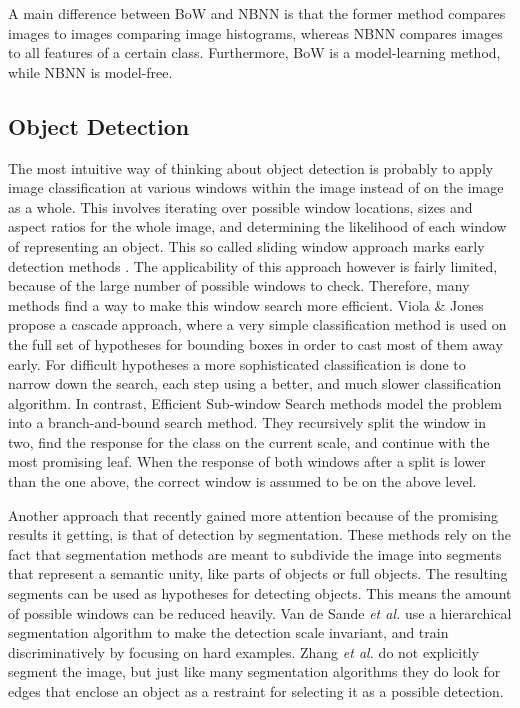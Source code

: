 A main difference between BoW and NBNN is that the former method compares images to images comparing image histograms, whereas NBNN compares images to all features of a certain class. Furthermore, BoW is a model-learning method, while NBNN is model-free.


\subsection{Object Detection} %
\label{sec:object_detection}

The most intuitive way of thinking about object detection is probably to apply image classification at various windows within the image instead of on the image as a whole. This involves iterating over possible window locations, sizes and aspect ratios for the whole image, and determining the likelihood of each window of representing an object. This so called sliding window approach marks early detection methods \cite{viola2004robust}. The applicability of this approach however is fairly limited, because of the large number of possible windows to check. Therefore, many methods find a way to make this window search more efficient. Viola \& Jones \cite{viola2004robust} propose a cascade approach, where a very simple classification method is used on the full set of hypotheses for bounding boxes in order to cast most of them away early. For difficult hypotheses a more sophisticated classification is done to narrow down the search, each step using a better, and much slower classification algorithm. In contrast, Efficient Sub-window Search methods \cite{behmo2010towards, lampert2008beyond, pedersoli2011coarse, yeh2009fast} model the problem into a branch-and-bound search method. They recursively split the window in two, find the response for the class on the current scale, and continue with the most promising leaf. When the response of both windows after a split is lower than the one above, the correct window is assumed to be on the above level.

Another approach that recently gained more attention because of the promising results it getting, is that of detection by segmentation. \cite{van2011segmentation,zhang2010free} These methods rely on the fact that segmentation methods are meant to subdivide the image into segments that represent a semantic unity, like parts of objects or full objects. The resulting segments can be used as hypotheses for detecting objects. This means the amount of possible windows can be reduced heavily. Van de Sande \emph{et al.} \cite{van2011segmentation} use a hierarchical segmentation algorithm to make the detection scale invariant, and train discriminatively by focusing on hard examples. Zhang \emph{et al.} \cite{zhang2010free} do not explicitly segment the image, but just like many segmentation algorithms they do look for edges that enclose an object as a restraint for selecting it as a possible detection.

